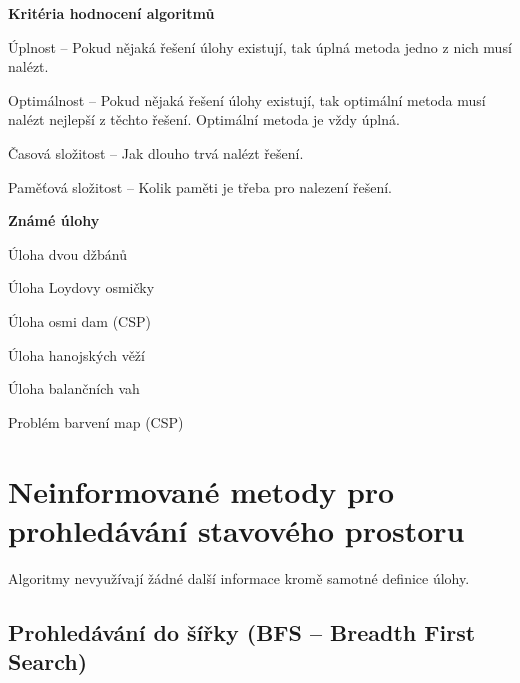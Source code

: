 \begin{compactitem}
    \item \textbf{Kritéria hodnocení algoritmů} \begin{compactitem}
        \item Úplnost -- Pokud nějaká řešení úlohy existují, tak úplná metoda jedno z nich musí nalézt.
        \item Optimálnost -- Pokud nějaká řešení úlohy existují, tak optimální metoda musí nalézt nejlepší z těchto řešení. Optimální metoda je vždy úplná.
        \item Časová složitost -- Jak dlouho trvá nalézt řešení.
        \item Paměťová složitost -- Kolik paměti je třeba pro nalezení řešení.
    \end{compactitem}

    \item \textbf{Známé úlohy} \begin{compactitem}
        \item Úloha dvou džbánů
        \item Úloha Loydovy osmičky
        \item Úloha osmi dam (CSP)
        \item Úloha hanojských věží
        \item Úloha balančních vah
        \item Problém barvení map (CSP)
    \end{compactitem}
\end{compactitem}


\section{Neinformované metody pro prohledávání stavového prostoru}

\begin{compactitem}
    \item Algoritmy nevyužívají žádné další informace kromě samotné definice úlohy.
\end{compactitem}

\subsection{Prohledávání do šířky (BFS -- Breadth First Search)}

